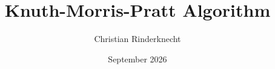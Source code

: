 \documentclass[compress,dvips,xcolor={dvipsnames},t]{beamer}
\title{\LARGE Knuth-Morris-Pratt Algorithm}
\author{\Large Christian Rinderknecht}
\institute{\normalsize Eszterházy Károly Katolikus Egyetem}
\date{September 2026}
\begin{document}
\frame{\maketitle}





\end{document}
